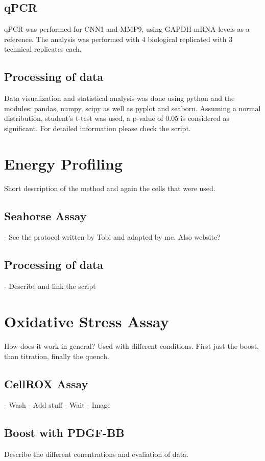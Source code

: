     \subsection{qPCR}
    qPCR was performed for CNN1 and MMP9, using GAPDH mRNA levels as a reference. The analysis was performed with 4 biological replicated with 3 technical replicates each.

    \subsection{Processing of data}
    Data visualization and statistical analysis was done using python and the modules: pandas, numpy, scipy as well as pyplot and seaborn. Assuming a normal distribution, student's t-test was used, a p-value of 0.05 is considered as significant. For detailed information please check the script.

\section{Energy Profiling}
\label{sec:seahorse}
Short description of the method and again the cells that were used.

    \subsection{Seahorse Assay}
    - See the protocol written by Tobi and adapted by me. Also website?

    \subsection{Processing of data}
    - Describe and link the script

\section{Oxidative Stress Assay}
\label{sec:cellrox}
How does it work in general?
Used with different conditions. First just the boost, than titration, finally the quench.

    \subsection{CellROX Assay}
    - Wash
    - Add stuff
    - Wait
    - Image

    \subsection{Boost with PDGF-BB}
    Describe the different conentrations and evaliation of data.

